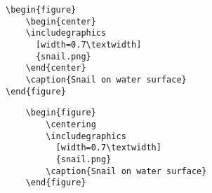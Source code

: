\documentclass{memoir}[article]
\begin{document}
\begin{minipage}{0.49\textwidth}
\begin{lstlisting}
\begin{figure}
    \begin{center}
    \includegraphics
      [width=0.7\textwidth]
      {snail.png}
    \end{center}
    \caption{Snail on water surface}
\end{figure}
\end{lstlisting}
\end{minipage}
\hfill
\begin{minipage}{0.49\textwidth}
\begin{lstlisting}
    \begin{figure}
        \centering
        \includegraphics
          [width=0.7\textwidth]
          {snail.png}
        \caption{Snail on water surface}
    \end{figure}
\end{lstlisting}
\end{minipage}

\hfill
{}
\end{document}
